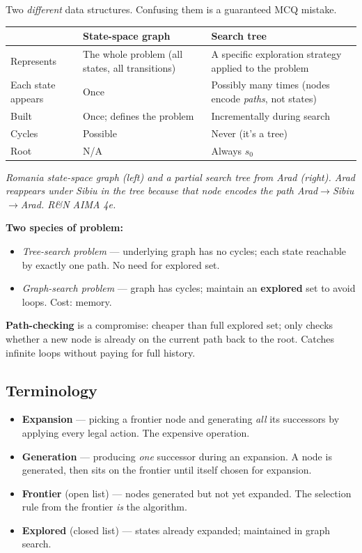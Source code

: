 \documentclass[11pt, a4paper]{article}
\newcommand{\thead}[1]{\textbf{#1}}
\begin{document}
Two \emph{different} data structures. Confusing them is a guaranteed MCQ mistake.

\begin{center}
\renewcommand{\arraystretch}{1.2}
\begin{tabularx}{\textwidth}{@{}p{4.5cm}p{4.5cm}X@{}}
\toprule
\thead{} & \thead{State-space graph} & \thead{Search tree} \\
\midrule
Represents & The whole problem (all states, all transitions) & A specific exploration strategy applied to the problem \\
Each state appears & Once & Possibly many times (nodes encode \emph{paths}, not states) \\
Built & Once; defines the problem & Incrementally during search \\
Cycles & Possible & Never (it's a tree) \\
Root & N/A & Always $s_0$ \\
\bottomrule
\end{tabularx}
\end{center}

\begin{center}

\footnotesize\textit{Romania state-space graph (left) and a partial search tree from Arad (right). Arad reappears under Sibiu in the tree because that node encodes the path Arad$\to$Sibiu$\to$Arad. R\&N AIMA 4e.}
\end{center}

\textbf{Two species of problem:}
\begin{itemize}
  \item \emph{Tree-search problem} — underlying graph has no cycles; each state reachable by exactly one path. No need for explored set.
  \item \emph{Graph-search problem} — graph has cycles; maintain an \textbf{explored} set to avoid loops. Cost: memory.
\end{itemize}

\textbf{Path-checking} is a compromise: cheaper than full explored set; only checks whether a new node is already on the current path back to the root. Catches infinite loops without paying for full history.

\subsection{Terminology}

\begin{itemize}
  \item \textbf{Expansion} — picking a frontier node and generating \emph{all} its successors by applying every legal action. The expensive operation.
  \item \textbf{Generation} — producing \emph{one} successor during an expansion. A node is generated, then sits on the frontier until itself chosen for expansion.
  \item \textbf{Frontier} (open list) — nodes generated but not yet expanded. The selection rule from the frontier \emph{is} the algorithm.
  \item \textbf{Explored} (closed list) — states already expanded; maintained in graph search.
\end{itemize}
\end{document}
